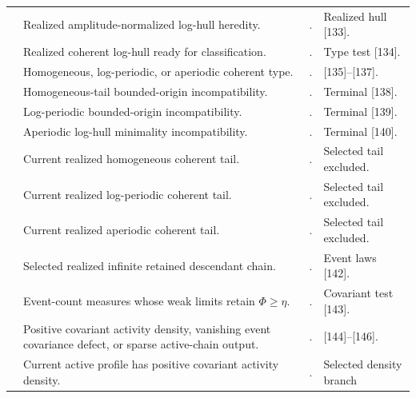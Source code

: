 \documentclass[11pt]{amsart}
\numberwithin{equation}{section}
\theoremstyle{plain}
\theoremstyle{definition}
\theoremstyle{remark}
\begin{document}
\begin{longtable}{@{}L{0.06\textwidth}L{0.25\textwidth}L{0.40\textwidth}L{0.21\textwidth}@{}}
\relax
[132] & Realized amplitude-normalized log-hull heredity. &
. & Realized hull [133].\\
\relax
[133] & Realized coherent log-hull ready for classification. &
. & Type test [134].\\
\relax
[134] & Homogeneous, log-periodic, or aperiodic coherent type. &
. & [135]--[137].\\
\relax
[135] & Homogeneous-tail bounded-origin incompatibility. &
. & Terminal [138].\\
\relax
[136] & Log-periodic bounded-origin incompatibility. &
. & Terminal [139].\\
\relax
[137] & Aperiodic log-hull minimality incompatibility. &
. & Terminal [140].\\
\relax
[138] & Current realized homogeneous coherent tail. &
. &
Selected tail excluded.\\
\relax
[139] & Current realized log-periodic coherent tail. &
. &
Selected tail excluded.\\
\relax
[140] & Current realized aperiodic coherent tail. &
. &
Selected tail excluded.\\
\relax
[141] & Selected realized infinite retained descendant chain. &
. &
Event laws [142].\\
\relax
[142] & Event-count measures whose weak limits retain
\(\Phi\ge\eta\). &
. & Covariant test [143].\\
\relax
[143] & Positive covariant activity density, vanishing event covariance
defect, or sparse active-chain output. &
. &
[144]--[146].\\
\relax
[144] & Current active profile has positive covariant activity density. &
. & Selected density branch

\end{longtable}
\end{document}
